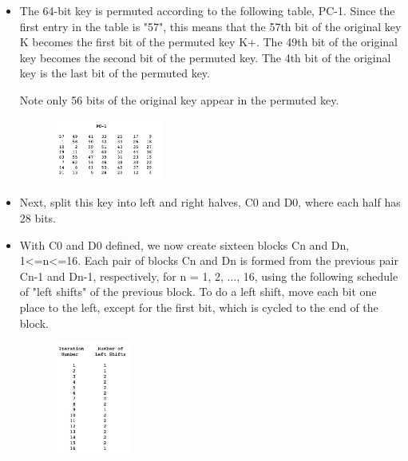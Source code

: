 \documentclass[fleqn, journal, onecolumn]{IEEEtran}             %
\theoremstyle{break}                                            %
\begin{document}
        \begin{itemize}
          \item The 64-bit key is permuted according to the following table, PC-1. 
          Since the first entry in the table is "57", this means that the 57th bit of the original 
          key K becomes the first bit of the permuted key K+. The 49th bit of the original key becomes 
          the second bit of the permuted key. The 4th bit of the original key is the last bit of the 
          permuted key. 
          
          Note only 56 bits of the original key appear in the permuted key.

          \begin{figure}[h]
            \includegraphics[width=0.35\textwidth]{PC1}
          \end{figure}

          \cite{page}


          \item Next, split this key into left and right halves, C0 and D0, where each half has 28 bits.
          
          \item With C0 and D0 defined, we now create sixteen blocks Cn and Dn, 1<=n<=16. Each pair of blocks 
          Cn and Dn is formed from the previous pair Cn-1 and Dn-1, respectively, for n = 1, 2, ..., 16, 
          using the following schedule of "left shifts" of the previous block. To do a left shift, 
          move each bit one place to the left, except for the first bit, which is cycled to the end of the block.

          \begin{figure}[h]
            \includegraphics[width=0.25\textwidth]{Shift}
          \end{figure}


\end{itemize}
\end{document}
